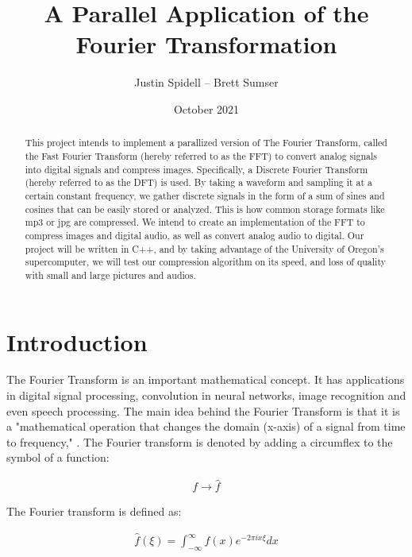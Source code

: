 \documentclass[12pt]{extarticle}
\title{A Parallel Application of the Fourier Transformation}
\author{Justin Spidell -- Brett Sumser}
\date{October 2021}
\begin{document}
 
\maketitle
\newpage
\begin{abstract}
\normalsize %

	This project intends to implement a parallized version of The Fourier Transform, called the Fast Fourier Transform (hereby referred to as the FFT) to convert analog signals into digital signals and compress images. 
	Specifically, a Discrete Fourier Transform (hereby referred to as the DFT) is used.
	By taking a waveform and sampling it at a certain constant frequency, we gather discrete signals in the form of a sum of sines and cosines that can be easily stored or analyzed.
	This is how common storage formats like mp3 or jpg are compressed.
	\newline
    \indent We intend to create an implementation of the FFT to compress images and digital audio, as well as convert analog audio to digital. 
    Our project will be written in C++, and by taking advantage of the University of Oregon's supercomputer, we will test our compression algorithm on its speed, and loss of quality with small and large pictures and audios.

\end{abstract}


\maketitle
\newpage
\section*{Introduction}

	The Fourier Transform is an important mathematical concept. It has applications
    in digital signal processing, convolution in neural networks, image recognition and even speech processing.
    The main idea behind the Fourier Transform is that it is a 
    "mathematical operation that changes the domain (x-axis) of a signal from time to frequency," \cite{Maklin:2019}. 
    The Fourier transform is denoted by adding a circumflex to the symbol of a function:

	\begin{align*}
		f \rightarrow \hat{f}
	\end{align*}

	The Fourier transform is defined as:

	\begin{align}
		\hat{f} (\xi)= \int^{\infty}_{-\infty}f(x) e^{-2 \pi i x \xi}dx
	\end{align}
\end{document}
